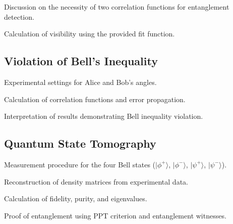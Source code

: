 Discussion on the necessity of two correlation functions for entanglement detection.

Calculation of visibility using the provided fit function.


\subsection{Violation of Bell’s Inequality}
Experimental settings for Alice and Bob’s angles.

Calculation of correlation functions and error propagation.

Interpretation of results demonstrating Bell inequality violation.

\subsection{Quantum State Tomography}
Measurement procedure for the four Bell states (\(|\phi^+\rangle\), \(|\phi^-\rangle\), \(|\psi^+\rangle\), \(|\psi^-\rangle\)).

Reconstruction of density matrices from experimental data.

Calculation of fidelity, purity, and eigenvalues.

Proof of entanglement using PPT criterion and entanglement witnesses.